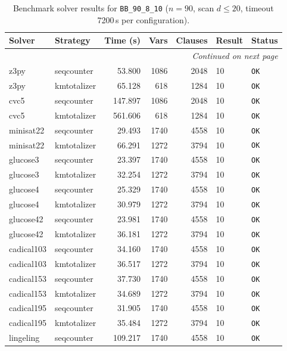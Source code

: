 \begin{longtable}{llrrrl p{}}
\caption{Benchmark solver results for \texttt{BB\_90\_8\_10} ($n=90$, scan $d \leq 20$, timeout 7200\,s per configuration).} \label{tab:bench-BB_90_8_10} \\
\toprule
Solver & Strategy & Time (s) & Vars & Clauses & Result & Status \\
\midrule
\endhead
\midrule
\multicolumn{7}{r}{\textit{Continued on next page}} \\
\midrule
\endfoot
\bottomrule
\endlastfoot
z3py & seqcounter & 53.800 & 1086 & 2048 & 10 & \texttt{OK} \\
z3py & kmtotalizer & 65.128 & 618 & 1284 & 10 & \texttt{OK} \\
cvc5 & seqcounter & 147.897 & 1086 & 2048 & 10 & \texttt{OK} \\
cvc5 & kmtotalizer & 561.606 & 618 & 1284 & 10 & \texttt{OK} \\
minisat22 & seqcounter & 29.493 & 1740 & 4558 & 10 & \texttt{OK} \\
minisat22 & kmtotalizer & 66.291 & 1272 & 3794 & 10 & \texttt{OK} \\
glucose3 & seqcounter & 23.397 & 1740 & 4558 & 10 & \texttt{OK} \\
glucose3 & kmtotalizer & 32.254 & 1272 & 3794 & 10 & \texttt{OK} \\
glucose4 & seqcounter & 25.329 & 1740 & 4558 & 10 & \texttt{OK} \\
glucose4 & kmtotalizer & 30.979 & 1272 & 3794 & 10 & \texttt{OK} \\
glucose42 & seqcounter & 23.981 & 1740 & 4558 & 10 & \texttt{OK} \\
glucose42 & kmtotalizer & 36.181 & 1272 & 3794 & 10 & \texttt{OK} \\
cadical103 & seqcounter & 34.160 & 1740 & 4558 & 10 & \texttt{OK} \\
cadical103 & kmtotalizer & 36.517 & 1272 & 3794 & 10 & \texttt{OK} \\
cadical153 & seqcounter & 37.730 & 1740 & 4558 & 10 & \texttt{OK} \\
cadical153 & kmtotalizer & 34.689 & 1272 & 3794 & 10 & \texttt{OK} \\
cadical195 & seqcounter & 31.905 & 1740 & 4558 & 10 & \texttt{OK} \\
cadical195 & kmtotalizer & 35.484 & 1272 & 3794 & 10 & \texttt{OK} \\
lingeling & seqcounter & 109.217 & 1740 & 4558 & 10 & \texttt{OK} \\

\end{longtable}
